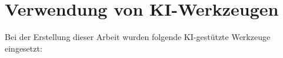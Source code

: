 \clearpage
\thispagestyle{plain}

\chapter*{Verwendung von KI-Werkzeugen}

\noindent
Bei der Erstellung dieser Arbeit wurden folgende KI-gestützte Werkzeuge eingesetzt:

\medskip


